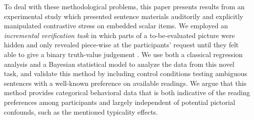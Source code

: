 \documentclass[fleqn,reqno,10pt]{article}
\renewcommand{\mymark}[1]{\textbf{#1}}
\begin{document}

To deal with these methodological problems, this paper presents
results from an experimental study which presented sentence materials
auditorily and explicitly manipulated contrastive stress on embedded
scalar items. We employed an \emph{incremental verification task} in
which parts of a to-be-evaluated picture were hidden and only revealed
piece-wise at the participants’ request until they felt able to give a
binary truth-value judgement \citep[see][]{Conroy2008}. We use both a
classical regression analysis and a Bayesian statistical model to
analyze the data from this novel task, and validate this method by
including control conditions testing ambiguous sentences with a
well-known preference on available readings. We argue that this method
provides categorical behavioral data that is both indicative of the
reading preferences among participants and largely independent of
potential pictorial confounds, such as the mentioned typicality
effects.
\end{document}
